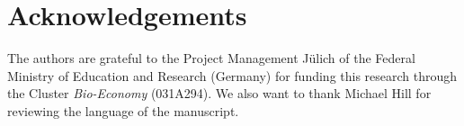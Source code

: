 \section{Acknowledgements}
The authors are grateful to the Project Management Jülich of the Federal Ministry of Education and Research (Germany) for funding this research through the Cluster \textit{Bio-Economy} (031A294). We also want to thank Michael Hill for reviewing the language of the manuscript.


\address{Kai Husmann\\
	Department of Forest Economics and Forest Management\\	
    University of Goettingen\\
    Germany\\}

\address{Alexander Lange\\
	Chair of Econometrics\\
    University of Goettingen\\
    Germany\\}

\address{Elmar Spiegel\\
	Chair of Statistics\\
    University of Goettingen\\
    Germany\\}
